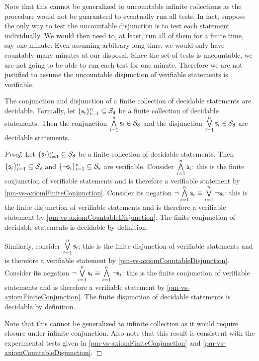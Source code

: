\begin{mathSection}
\begin{justification}
			Note that this cannot be generalized to uncountable infinite collections as the procedure would not be guaranteed to eventually run all tests. In fact, suppose the only way to test the uncountable disjunction is to test each statement individually. We would then need to, at least, run all of them for a finite time, say one minute. Even assuming arbitrary long time, we would only have countably many minutes at our disposal. Since the set of tests is uncountable, we are not going to be able to run each test for one minute. Therefore we are not justified to assume the uncountable disjunction of verifiable statements is verifiable.
		\end{justification}
		\begin{prop}\label{pm-vs-decidableConjunctionDisjunction}
			The conjunction and disjunction of a finite collection of decidable statements are decidable. Formally, let $\{\mathsf{s}_i\}_{i=1}^{n} \subseteq \mathcal{S}_\textsf{d}$ be a finite collection of decidable statements. Then the conjunction $\bigwedge\limits_{i=1}^{n} \mathsf{s}_i \in \mathcal{S}_\textsf{d}$ and the disjunction $\bigvee\limits_{i=1}^{n} \mathsf{s}_i \in \mathcal{S}_\textsf{d}$ are decidable statements.
		\end{prop}
		\begin{proof}
			Let $\{\mathsf{s}_i\}_{i=1}^{n} \subseteq \mathcal{S}_\textsf{d}$ be a finite collection of decidable statements. Then $\{\mathsf{s}_i\}_{i=1}^{n} \subseteq \mathcal{S}_\textsf{v}$ and $\{\neg\mathsf{s}_i\}_{i=1}^{n} \subseteq \mathcal{S}_\textsf{v}$ are verifiable. Consider $\bigwedge\limits_{i=1}^{n} \mathsf{s}_i$: this is the finite conjunction of verifiable statements and is therefore a verifiable statement by \ref{pm-vs-axiomFiniteConjunction}. Consider its negation $\neg \bigwedge\limits_{i=1}^{n} \mathsf{s}_i \equiv \bigvee\limits_{i=1}^{n} \neg \mathsf{s}_i$: this is the finite disjunction of verifiable statements and is therefore a verifiable statement by \ref{pm-vs-axiomCountableDisjunction}. The finite conjunction of decidable statements is decidable by definition.
			
			Similarly, consider $\bigvee\limits_{i=1}^{n} \mathsf{s}_i$: this is the finite disjunction of verifiable statements and is therefore a verifiable statement by \ref{pm-vs-axiomCountableDisjunction}. Consider its negation $\neg \bigvee\limits_{i=1}^{n} \mathsf{s}_i \equiv \bigwedge\limits_{i=1}^{n} \neg \mathsf{s}_i$: this is the finite conjunction of verifiable statements and is therefore a verifiable statement by \ref{pm-vs-axiomFiniteConjunction}. The finite disjunction of decidable statements is decidable by definition.
			
			Note that this cannot be generalized to infinite collection as it would require closure under infinite conjunction. Also note that this result is consistent with the experimental tests given in \ref{pm-vs-axiomFiniteConjunction} and \ref{pm-vs-axiomCountableDisjunction}.
		\end{proof}
	\end{mathSection}
	
